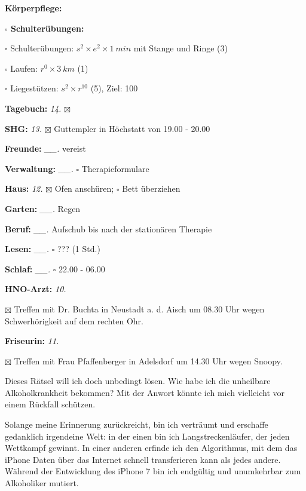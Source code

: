 \documentclass[10pt,a4paper]{article}
\newcommand\prop[1] {{\color {alizarin} {\bf #1}}}             %
\newcommand\opti[1] {{\color {amethyst} {\bf #1}}}             %
\newcommand\mand[1] {{\color {burntorange} {\bf #1}}}          %
\newcommand\topvskip {\vskip 8pt}
\newcommand\topspace{\vskip -15pt \hskip 20pt}
\newcommand\bottomspace{\vskip 4pt}
\newcommand\n[1] { {\sl #1.} \hskip 5pt }
\begin{document}
\begin{mdframed}[style=daystyle]
\begin{labeling}{{\mand {Körperpflege:}}}
\begin{minipage}{0.75\textwidth}
\begin{labeling}{\prop {$\square$ {Schulterübungen:}}}
      \item[$\square$ Schulterübungen:] $s^2 \times e^2 \times 1\ min$ mit Stange und Ringe (3)
      \item[$\square$ Laufen:]          $r^0 \times 3\ km$ (1)
      \item[$\square$ Liegestützen:]    $s^2 \times r^{10}$ (5), Ziel: 100
      \end{labeling}
    \end{minipage}
    \bottomspace    
  \item[{\mand {Tagebuch:}}]       \n{14} $\boxtimes$
  \item[{\mand {SHG:}}]            \n{13} $\boxtimes$ Guttempler in Höchstatt von 19.00 - 20.00
  \item[{\mand {Freunde:}}]      \n{\_\_} vereist
  \item[{\mand {Verwaltung:}}]   \n{\_\_} $\square$ Therapieformulare
  \item[{\mand {Haus:}}]           \n{12} $\boxtimes$ Ofen anschüren; $\square$ Bett überziehen
  \item[{\mand {Garten:}}]       \n{\_\_} Regen
  \item[{\mand {Beruf:}}]        \n{\_\_} Aufschub bis nach der stationären Therapie
  \item[{\mand {Lesen:}}]        \n{\_\_} $\square$ ??? (1 Std.)
  \item[{\mand {Schlaf:}}]       \n{\_\_} $\square$ 22.00 - 06.00
  \item[{\opti {HNO-Arzt:}}]       \n{10} 
    \topspace
    \begin{minipage}{0.75\textwidth}
      $\boxtimes$ Treffen mit Dr. Buchta in Neustadt a. d. Aisch um 08.30 Uhr
      wegen Schwerhörigkeit auf dem rechten Ohr.
    \end{minipage}
    \bottomspace
  \item[{\opti {Friseurin:}}]      \n{11} 
    \topspace
    \begin{minipage}{0.75\textwidth}
      $\boxtimes$ Treffen mit Frau Pfaffenberger in Adelsdorf um 14.30 Uhr wegen Snoopy.
    \end{minipage}
    \bottomspace
  \end{labeling}

  \topvskip
Dieses Rätsel will ich doch unbedingt lösen. Wie habe ich die unheilbare
Alkoholkrankheit bekommen? Mit der Anwort könnte ich mich vielleicht vor einem
Rückfall schützen.

\vskip 4pt
Solange meine Erinnerung zurückreicht, bin ich verträumt und erschaffe
gedanklich irgendeine Welt: in der einen bin ich Langstreckenläufer, der jeden
Wettkampf gewinnt. In einer anderen erfinde ich den Algorithmus, mit dem das
iPhone Daten über das Internet schnell transferieren kann als jedes andere.
Während der Entwicklung des iPhone 7 bin ich endgültig und unumkehrbar zum
Alkoholiker mutiert.


\end{mdframed}
\end{document}
